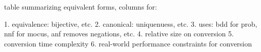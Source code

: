 \section{\color{blue}{Summary and Overview - Knowledge Consolidation Map}}
table summarizing equivalent forms, columns for:

1. equivalence: bijective, etc.
2. canonical: uniquenuess, etc.
3. uses: bdd for prob, nnf for mocus, anf removes negations, etc.
4. relative size on conversion
5. conversion time complexity
6. real-world performance constraints for conversion